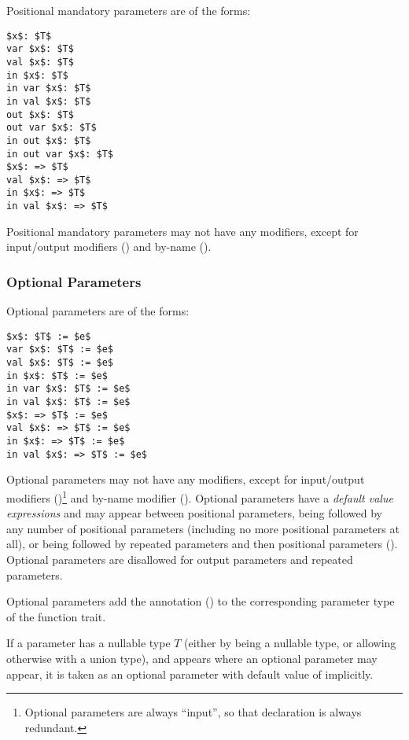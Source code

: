 Positional mandatory parameters are of the forms:
\begin{lstlisting}
$x$: $T$
var $x$: $T$
val $x$: $T$
in $x$: $T$
in var $x$: $T$
in val $x$: $T$
out $x$: $T$
out var $x$: $T$
in out $x$: $T$
in out var $x$: $T$
$x$: => $T$
val $x$: => $T$
in $x$: => $T$
in val $x$: => $T$
\end{lstlisting}

Positional mandatory parameters may not have any modifiers, except for input/output modifiers () and by-name (). 






\subsubsection{Optional Parameters}
\label{sec:optional-parameters}

Optional parameters are of the forms:
\begin{lstlisting}
$x$: $T$ := $e$
var $x$: $T$ := $e$
val $x$: $T$ := $e$
in $x$: $T$ := $e$
in var $x$: $T$ := $e$
in val $x$: $T$ := $e$
$x$: => $T$ := $e$
val $x$: => $T$ := $e$
in $x$: => $T$ := $e$
in val $x$: => $T$ := $e$
\end{lstlisting}

Optional parameters may not have any modifiers, except for input/output modifiers ()\footnote{Optional parameters are always ``input'', so that declaration is always redundant.} and by-name modifier (). Optional parameters have a {\em default value expressions} and may appear between positional parameters, being followed by any number of positional parameters (including no more positional parameters at all), or being followed by repeated parameters and then positional parameters (). Optional parameters are disallowed for output parameters and repeated parameters. 

Optional parameters add the annotation ()  to the corresponding parameter type of the function trait. 

If a parameter has a nullable type $T$ (either by being a nullable type, or allowing otherwise  with a union type), and appears where an optional parameter may appear, it is taken as an optional parameter with default value of  implicitly. 







